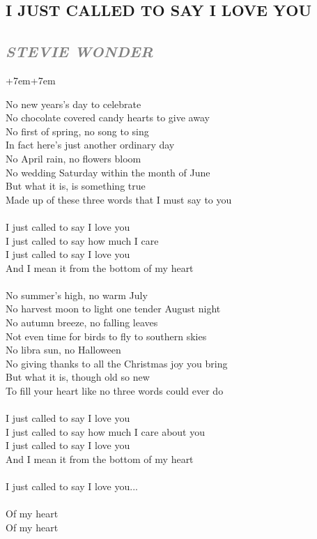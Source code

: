 \documentclass[100pt,a4paper]{report}
\newenvironment{song1}[3]
	{
			\begin{spacing}{0.6}
				\section*{\LARGE\centering \MakeUppercase{\textbf{{#1}}}}
				\subsection*{\Large\centering \textit{\textcolor{gray}{\MakeUppercase{{#2}}}}}
			\end{spacing}
			\vspace{0.8cm}
			\begin{adjustwidth}{+7em}{+7em}
			\Large
			
	}
	{
		\end{adjustwidth}
		\newpage
    }
\begin{document}
\begin{song1}{I Just Called to Say I Love You}{Stevie Wonder}
\noindent
No new years's day to celebrate\\
No chocolate covered candy hearts to give away\\
No first of spring, no song to sing\\
In fact here's just another ordinary day\\
No April rain, no flowers bloom\\
No wedding Saturday within the month of June\\
But what it is, is something true\\
Made up of these three words that I must say to you\\
\\
I just called to say I love you\\
I just called to say how much I care\\
I just called to say I love you\\
And I mean it from the bottom of my heart\\
\\
No summer's high, no warm July\\
No harvest moon to light one tender August night\\
No autumn breeze, no falling leaves\\
Not even time for birds to fly to southern skies\\
No libra sun, no Halloween\\
No giving thanks to all the Christmas joy you bring\\
But what it is, though old so new\\
To fill your heart like no three words could ever do\\
\\
I just called to say I love you\\
I just called to say how much I care about you\\
I just called to say I love you\\
And I mean it from the bottom of my heart\\
\\
I just called to say I love you...\\
\\
Of my heart\\
Of my heart 
\end{song1}
\end{document}
